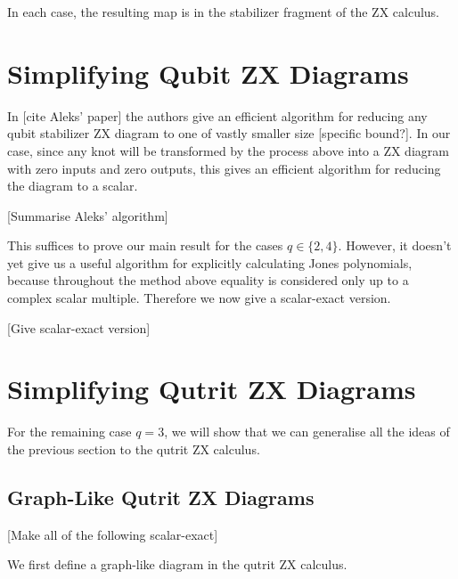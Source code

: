 \documentclass[11pt, oneside]{article}      %
\begin{document}
In each case, the resulting map is in the stabilizer fragment of the ZX calculus. 

\section{Simplifying Qubit ZX Diagrams}

In [cite Aleks' paper] the authors give an efficient algorithm for reducing any qubit stabilizer ZX diagram to one of vastly smaller size [specific bound?]. In our case, since any knot will be transformed by the process above into a ZX diagram with zero inputs and zero outputs, this gives an efficient algorithm for reducing the diagram to a scalar.\newline

[Summarise Aleks' algorithm]\newline

This suffices to prove our main result for the cases $q \in \{2, 4\}$. However, it doesn't yet give us a useful algorithm for explicitly calculating Jones polynomials, because throughout the method above equality is considered only up to a complex scalar multiple. Therefore we now give a scalar-exact version.\newline

[Give scalar-exact version]\newline

\section{Simplifying Qutrit ZX Diagrams}

For the remaining case $q=3$, we will show that we can generalise all the ideas of the previous section to the qutrit ZX calculus.

\subsection{Graph-Like Qutrit ZX Diagrams}


[Make all of the following scalar-exact]\newline

We first define a graph-like diagram in the qutrit ZX calculus.
\end{document}
